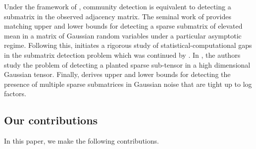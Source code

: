 \documentclass{article}
\begin{document}
 Under the framework of \cite{arias2014community, verzelen2015community}, community detection is equivalent to detecting a submatrix in the observed adjacency matrix. The seminal work of \cite{butucea2013detection} provides matching upper and lower bounds for detecting a sparse submatrix of elevated mean in a matrix of Gaussian random variables under a particular asymptotic regime. Following this, \cite{ma2015computational} initiates a rigorous study of statistical-computational gaps in the submatrix detection problem which was continued by \cite{chen2016statistical, hajek2017information, brennan2018reducibility}. In \cite{luo2022tensor}, the authors study the problem of detecting a planted sparse sub-tensor in a high dimensional Gaussian tensor. Finally, \cite{dadon2024detection} derives upper and lower bounds for detecting the presence of multiple sparse submatrices in Gaussian noise that are tight up to log factors.

 \subsection{Our contributions}\label{sec_contributions}

 In this paper, we make the following contributions.
\end{document}
